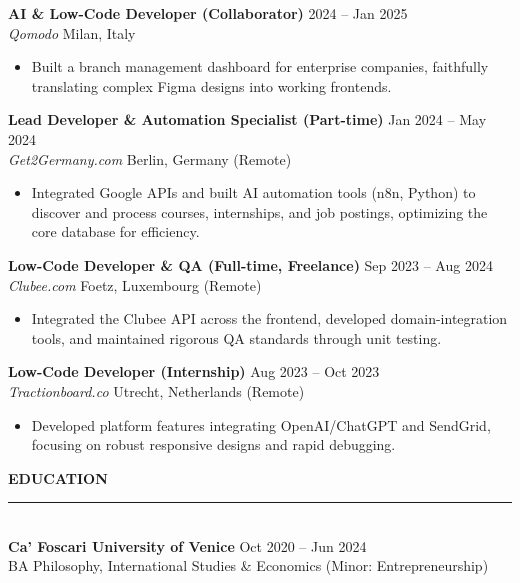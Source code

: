 \documentclass[10pt, a4paper]{article}
\begin{document}
\vspace{0.2cm}
\textbf{AI \& Low-Code Developer (Collaborator)} \hfill 2024 -- Jan 2025 \\
\textit{Qomodo} \hfill Milan, Italy
\begin{itemize}[leftmargin=0.5cm, nosep]
    \item Built a branch management dashboard for enterprise companies, faithfully translating complex Figma designs into working frontends.
\end{itemize}

\vspace{0.2cm}
\textbf{Lead Developer \& Automation Specialist (Part-time)} \hfill Jan 2024 -- May 2024 \\
\textit{Get2Germany.com} \hfill Berlin, Germany (Remote)
\begin{itemize}[leftmargin=0.5cm, nosep]
    \item Integrated Google APIs and built AI automation tools (n8n, Python) to discover and process courses, internships, and job postings, optimizing the core database for efficiency.
\end{itemize}

\vspace{0.2cm}
\textbf{Low-Code Developer \& QA (Full-time, Freelance)} \hfill Sep 2023 -- Aug 2024 \\
\textit{Clubee.com} \hfill Foetz, Luxembourg (Remote)
\begin{itemize}[leftmargin=0.5cm, nosep]
    \item Integrated the Clubee API across the frontend, developed domain-integration tools, and maintained rigorous QA standards through unit testing.
\end{itemize}

\vspace{0.2cm}
\textbf{Low-Code Developer (Internship)} \hfill Aug 2023 -- Oct 2023 \\
\textit{Tractionboard.co} \hfill Utrecht, Netherlands (Remote)
\begin{itemize}[leftmargin=0.5cm, nosep]
    \item Developed platform features integrating OpenAI/ChatGPT and SendGrid, focusing on robust responsive designs and rapid debugging.
\end{itemize}

\vspace{0.3cm}
\noindent \textbf{EDUCATION} \\
\noindent\rule{\textwidth}{0.4pt} \\
\textbf{Ca' Foscari University of Venice} \hfill Oct 2020 -- Jun 2024 \\
BA Philosophy, International Studies \& Economics (Minor: Entrepreneurship)
\end{document}
